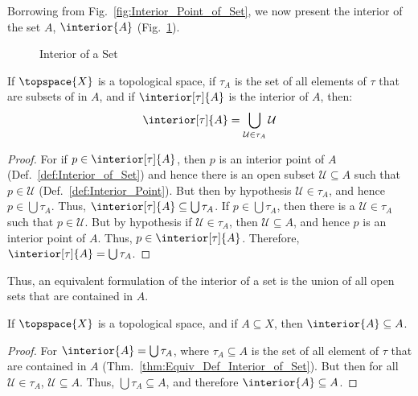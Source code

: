         Borrowing from Fig.~\ref{fig:Interior_Point_of_Set}, we now present
        the interior of the set $A$, $\interior{A}$
        (Fig.~\ref{fig:Interior_of_Set}).
        \begin{figure}[H]
            \centering
            \captionsetup{type=figure}
            
            \caption{Interior of a Set}
            \label{fig:Interior_of_Set}
        \end{figure}
        \begin{theorem}
            \label{thm:Equiv_Def_Interior_of_Set}%
            If $\topspace{X}$ is a topological space, if
            $\tau_{A}$ is the set of all elements of $\tau$ that are subsets
            of in $A$, and if $\interior[\tau]{A}$ is the interior of $A$,
            then:
            \begin{equation}
                \interior[\tau]{A}=
                    \bigcup_{\mathcal{U}\in\tau_{A}}\mathcal{U}
            \end{equation}
        \end{theorem}
        \begin{proof}
            For if $p\in\interior[\tau]{A}$, then $p$ is an interior point
            of $A$ (Def.~\ref{def:Interior_of_Set}) and hence there is an
            open subset $\mathcal{U}\subseteq{A}$ such that
            $p\in\mathcal{U}$ (Def.~\ref{def:Interior_Point}). But then by
            hypothesis $\mathcal{U}\in\tau_{A}$, and hence
            $p\in\bigcup\tau_{A}$. Thus,
            $\interior[\tau]{A}\subseteq\bigcup\tau_{A}$. If
            $p\in\bigcup\tau_{A}$, then there is a $\mathcal{U}\in\tau_{A}$
            such that $p\in\mathcal{U}$. But by hypothesis if
            $\mathcal{U}\in\tau_{A}$, then $\mathcal{U}\subseteq{A}$, and
            hence $p$ is an interior point of $A$. Thus,
            $p\in\interior[\tau]{A}$. Therefore,
            $\interior[\tau]{A}=\bigcup\tau_{A}$.
        \end{proof}
        Thus, an equivalent formulation of the interior of a set is the
        union of all open sets that are contained in $A$.
        \begin{theorem}
            \label{thm:Interior_is_Smaller}%
            If $\topspace{X}$ is a topological space, and if
            $A\subseteq{X}$, then $\interior{A}\subseteq{A}$.
        \end{theorem}
        \begin{proof}
            For $\interior{A}=\bigcup\tau_{A}$, where $\tau_{A}\subseteq{A}$
            is the set of all element of $\tau$ that are contained in $A$
            (Thm.~\ref{thm:Equiv_Def_Interior_of_Set}). But then for all
            $\mathcal{U}\in\tau_{A}$, $\mathcal{U}\subseteq{A}$. Thus,
            $\bigcup\tau_{A}\subseteq{A}$, and therefore
            $\interior{A}\subseteq{A}$.
        \end{proof}
